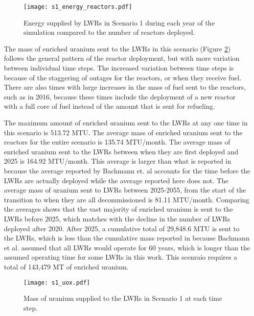 \begin{figure}
    \centering
    \texttt{[image: s1\_energy\_reactors.pdf]}
    \caption{Energy supplied by \glspl{LWR} in Scenario 1 during each year of
    the simulation compared to the number of reactors deployed.}
    \label{fig:energy_reactor1}
\end{figure}


The mass of enriched uranium sent to the \glspl{LWR} in this scenario (Figure 
\ref{fig:fuel1}) follows the general pattern of the reactor deployment, but with 
more variation between individual time steps. The increased variation between 
time steps is because of the staggering of outages for the reactors, or when 
they receive fuel. There are also times with large increases in the mass of fuel 
sent to the reactors, such as in 2016, because these times include the deployment 
of a new reactor with a full core of fuel instead of the amount that is 
sent for refueling. 

The maximum amount of enriched uranium sent to the \glspl{LWR} at any one 
time in this scenario is 513.72 MTU. The average mass of enriched uranium sent to 
the reactors for the entire scenario is 135.74 MTU/month. The average mass of 
enriched uranium sent to the \glspl{LWR} between when they are first deployed 
and 2025 is 164.92 MTU/month. This average is larger than what is reported in 
\cite{bachmann_enrichment_2021} because the average reported by 
Bachmann et. al accounts for the time before the \glspl{LWR} are actually 
deployed while the average reported here does not. The average mass of 
uranium sent to \glspl{LWR} between 2025-2055, from the start of the transition 
to when they are all decommissioned is 81.11 MTU/month. Comparing the averages 
shows that the vast majority of enriched uranium is sent to the \glspl{LWR} 
before 2025, which matches with the decline in the number of \glspl{LWR} 
deployed after 2020. After 2025, a cumulative total of 29,848.6 MTU is 
sent to the \glspl{LWR},
which is less than the cumulative mass reported in \cite{bachmann_enrichment_2021}
because Bachmann et al. assumed that all \glspl{LWR} would operate for 60 years, 
which is longer than the assumed operating time for some \glspl{LWR} in 
this work. This scenraio requires a total of 143,479 MT of enriched uranium.

\begin{figure}
    \centering
    \texttt{[image: s1\_uox.pdf]}
    \caption{Mass of uranium supplied to the LWRs in Scenario 1 at each time step.}
    \label{fig:fuel1}
\end{figure}

